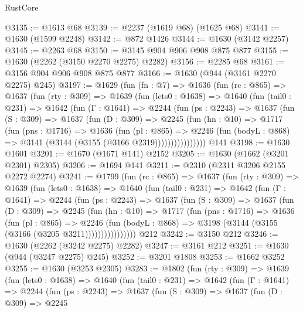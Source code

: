 \begin{lexlean}{RustCore}
\begin{coremodule}
@3135 := @1613 @68
@3139 := @2237 (@1619 @68) (@1625 @68)
@3141 := @1630 (@1599 @2248)
@3142 := @872 @1426
@3144 := @1630 (@3142 @2257)
@3145 := @2263 @68
@3150 := @3145 @904 @906 @908 @875 @877
@3155 := @1630 (@2262 (@3150 @2270 @2275) @2282)
@3156 := @2285 @68
@3161 := @3156 @904 @906 @908 @875 @877
@3166 := @1630 (@944 (@3161 @2270 @2275) @245)
@3197 := @1629
    (fun (fn : @7) =>
    @1636
      (fun (rc : @865) =>
      @1637
        (fun (rty : @309) =>
        @1639
          (fun (lets0 : @1638) =>
          @1640
            (fun (tail0 : @231) =>
            @1642
              (fun (Γ : @1641) =>
              @2244
                (fun (ps : @2243) =>
                @1637
                  (fun (S : @309) =>
                  @1637
                    (fun (D : @309) =>
                    @2245
                      (fun (hn : @10) =>
                      @1717
                        (fun (pns : @1716) =>
                        @1636
                          (fun (pl : @865) =>
                          @2246
                            (fun (bodyL : @868) => @3141 (@3144 (@3155 (@3166 @2319))))))))))))))))
    @141
@3198 := @1630 @1601
@3201 := @1670 (@1671 @141) @2152
@3205 := @1630 (@1662 (@3201 @2301) @2305)
@3206 := @1694 @141
@3211 := @2310 (@2311 @3206 @2155 @2272 @2274)
@3241 := @1799
    (fun (rc : @865) =>
    @1637
      (fun (rty : @309) =>
      @1639
        (fun (lets0 : @1638) =>
        @1640
          (fun (tail0 : @231) =>
          @1642
            (fun (Γ : @1641) =>
            @2244
              (fun (ps : @2243) =>
              @1637
                (fun (S : @309) =>
                @1637
                  (fun (D : @309) =>
                  @2245
                    (fun (hn : @10) =>
                    @1717
                      (fun (pns : @1716) =>
                      @1636
                        (fun (pl : @865) =>
                        @2246
                          (fun (bodyL : @868) =>
                          @3198 (@3144 (@3155 (@3166 (@3205 @3211))))))))))))))))
    @212
@3242 := @3150 @212
@3246 := @1630 (@2262 (@3242 @2275) @2282)
@3247 := @3161 @212
@3251 := @1630 (@944 (@3247 @2275) @245)
@3252 := @3201 @1808
@3253 := @1662 @3252
@3255 := @1630 (@3253 @2305)
@3283 := @1802
    (fun (rty : @309) =>
    @1639
      (fun (lets0 : @1638) =>
      @1640
        (fun (tail0 : @231) =>
        @1642
          (fun (Γ : @1641) =>
          @2244
            (fun (ps : @2243) =>
            @1637
              (fun (S : @309) =>
              @1637
                (fun (D : @309) =>
                @2245

\end{coremodule}
\end{lexlean}
